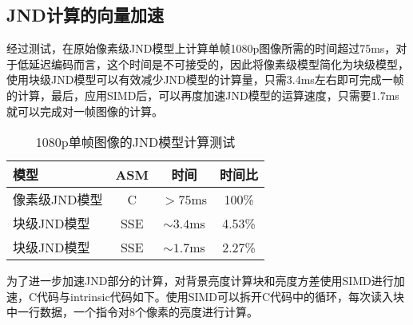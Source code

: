  \subsection{JND计算的向量加速}

  经过测试，在原始像素级JND模型上计算单帧1080p图像所需的时间超过75ms，对于低延迟编码而言，这个时间是不可接受的，因此将像素级模型简化为块级模型，使用块级JND模型可以有效减少JND模型的计算量，只需3.4ms左右即可完成一帧的计算，最后，应用SIMD后，可以再度加速JND模型的运算速度，只需要1.7ms就可以完成对一帧图像的计算。

  \begin{table}[!hpt]
    \renewcommand{\arraystretch}{0.9}
    \caption{1080p单帧图像的JND模型计算测试}
    \label{tab:jnd-compute}
    \centering
    \begin{tabular}{lccc} \toprule
      模型 & ASM & 时间 &时间比  \\ \midrule
      像素级JND模型 & C   & $>75$ms & 100\% \\
      块级JND模型   & SSE & $\sim 3.4$ms & 4.53\% \\
      块级JND模型   & SSE & $\sim 1.7$ms & 2.27\%\\ \bottomrule
    \end{tabular}
  \end{table}

  为了进一步加速JND部分的计算，对背景亮度计算块和亮度方差使用SIMD进行加速，C代码与intrinsic代码如下。使用SIMD可以拆开C代码中的循环，每次读入块中一行数据，一个指令对8个像素的亮度进行计算。

